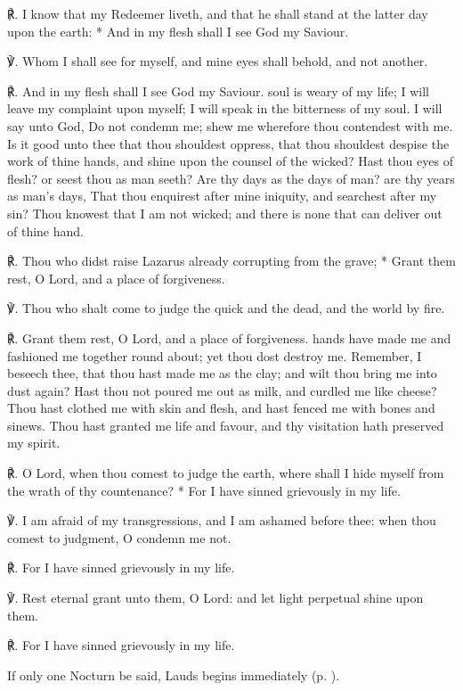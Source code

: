 \par
℟. I know {\dag} that my Redeemer liveth, and that he shall stand at the latter day upon the earth: * And in my flesh shall I see God my Saviour.\par
℣. Whom I shall see for myself, and mine eyes shall behold, and not another.\par
℟. And in my flesh shall I see God my Saviour.
 soul is weary of my life; I will leave my complaint upon myself; I will speak in the bitterness of my soul. I will say unto God, Do not condemn me; shew me wherefore thou contendest with me. Is it good unto thee that thou shouldest oppress, that thou shouldest despise the work of thine hands, and shine upon the counsel of the wicked? Hast thou eyes of flesh? or seest thou as man seeth? Are thy days as the days of man? are thy years as man's days, That thou enquirest after mine iniquity, and searchest after my sin? Thou knowest that I am not wicked; and there is none that can deliver out of thine hand.\par
℟. Thou who didst raise Lazarus {\dag} already corrupting from the grave; * Grant them rest, O Lord, and a place of forgiveness.\par
℣. Thou who shalt come to judge the quick and the dead, and the world by fire.\par
℟. Grant them rest, O Lord, and a place of forgiveness.
 hands have made me and fashioned me together round about; yet thou dost destroy me. Remember, I beseech thee, that thou hast made me as the clay; and wilt thou bring me into dust again? Hast thou not poured me out as milk, and curdled me like cheese? Thou hast clothed me with skin and flesh, and hast fenced me with bones and sinews. Thou hast granted me life and favour, and thy visitation hath preserved my spirit.\par
℟. O Lord, {\dag} when thou comest to judge the earth, where shall I hide myself from the wrath of thy countenance? * For I have sinned grievously in my life.\par
℣. I am afraid of my transgressions, and I am ashamed before thee: when thou comest to judgment, O condemn me not.\par
℟. For I have sinned grievously in my life.\par
℣. Rest eternal grant unto them, O Lord: and let light perpetual shine upon them.\par
℟. For I have sinned grievously in my life.
\begin{rubric}
    {If only one Nocturn be said, Lauds begins immediately (p. \pageref{laudsdead}).}
\end{rubric}
